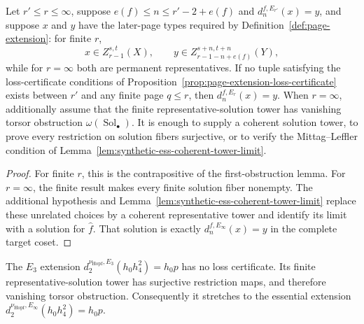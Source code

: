 \begin{corollary}
  \label{cor:page-extension-stretch}
  \notready
  Let $r'\le r\le\infty$, suppose
  $e(f)\le n\le r'-2+e(f)$ and $d_n^{f,E_{r'}}(x)=y$, and suppose $x$
  and $y$ have the later-page types required by
  Definition~\ref{def:page-extension}: for finite $r$,
  \[
    x\in Z_{r-1}^{s,t}(X),\qquad
    y\in Z_{r-1-n+e(f)}^{s+n,t+n}(Y),
  \]
  while for $r=\infty$ both are permanent representatives.  If no tuple satisfying the loss-certificate conditions of
  Proposition~\ref{prop:page-extension-loss-certificate} exists between
  $r'$ and any finite page $q\le r$, then $d_n^{f,E_r}(x)=y$.
  When $r=\infty$, additionally assume that the finite representative-solution
  tower has vanishing torsor obstruction
  $\omega(\operatorname{Sol}_\bullet)$.  It is enough to supply a coherent
  solution tower, to prove every restriction on solution fibers surjective, or
  to verify the Mittag--Leffler condition of
  Lemma~\ref{lem:synthetic-ess-coherent-tower-limit}.
\end{corollary}

\begin{proof}
  For finite $r$, this is the contrapositive of the first-obstruction lemma.
  For $r=\infty$, the finite result makes every finite solution fiber
  nonempty.  The additional hypothesis and
  Lemma~\ref{lem:synthetic-ess-coherent-tower-limit} replace these unrelated
  choices by a coherent representative tower and identify its limit with a
  solution for $\widehat f$.  That solution is exactly
  $d_n^{f,E_\infty}(x)=y$ in the complete target coset.
\end{proof}

\begin{proposition}
  \label{prop:page-stretch-regression}
  \notready
  The $E_3$ extension
  $d_2^{\nu_{\mathrm{Hopf}},E_3}(h_0h_4^2)=h_0p$ has no loss certificate.
  Its finite representative-solution tower has surjective restriction maps,
  and therefore vanishing torsor obstruction.  Consequently it stretches to
  the essential extension
  $d_2^{\nu_{\mathrm{Hopf}},E_\infty}(h_0h_4^2)=h_0p$.
\end{proposition}

